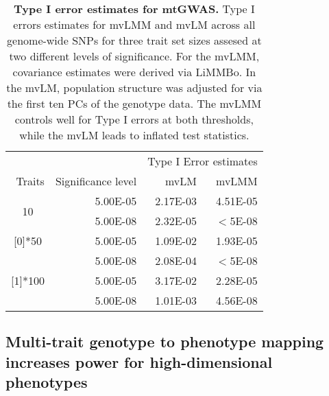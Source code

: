 \begin{table}[htbp]
  \centering
  \caption{\textbf{Type I error estimates for mtGWAS.} Type I errors estimates for mvLMM and mvLM across all genome-wide SNPs for three trait set sizes assesed at two different levels of significance.  For the mvLMM,  covariance estimates were derived via LiMMBo. In the mvLM, population structure was adjusted for via the first ten PCs of the genotype data. The mvLMM controls well for Type I errors at both thresholds, while the mvLM leads to inflated test statistics.}
    \begin{tabular}{crrr}
    \toprule
          &       & \multicolumn{2}{c}{Type I Error estimates} \\
\cmidrule{3-4}    \multicolumn{1}{r}{Traits} & Significance level & mvLM & mvLMM \\
    \midrule
    \multirow{2}[1]{*}{10} & 5.00E-05 & 2.17E-03 & 4.51E-05 \\
          & 5.00E-08 & 2.32E-05 & \(<\)5E-08 \\
             \addlinespace[0.5ex]
    \multirow{2}[0]{*}{50} & 5.00E-05 & 1.09E-02 & 1.93E-05 \\
          & 5.00E-08 & 2.08E-04 & \(<\)5E-08 \\
             \addlinespace[0.5ex]
    \multirow{2}[1]{*}{100} & 5.00E-05 & 3.17E-02 & 2.28E-05 \\
          & 5.00E-08 & 1.01E-03 & 4.56E-08 \\
    \bottomrule
    \end{tabular}%
  \label{tab:calibration}%
\end{table}%





\subsection{Multi-trait genotype to phenotype mapping increases power for high-dimensional phenotypes}
